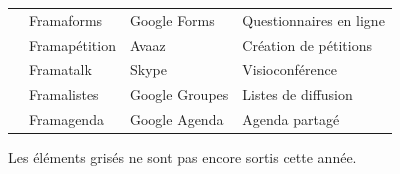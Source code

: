 \documentclass[10pt,a4paper, twoside]{report}
\begin{document}
{\begin{tabular}{|c|l|l|l|}
		\cline{2-4}
		& \cellcolor{lightgray}Framaforms & \cellcolor{lightgray}Google Forms & \cellcolor{lightgray}Questionnaires en ligne \\
		\cline{2-4}
		& \cellcolor{lightgray}Framapétition & \cellcolor{lightgray}Avaaz & \cellcolor{lightgray}Création de pétitions \\
		\cline{2-4}
		& \cellcolor{lightgray}Framatalk & \cellcolor{lightgray}Skype & \cellcolor{lightgray}Visioconférence \\
		\cline{2-4}
		& \cellcolor{lightgray}Framalistes & \cellcolor{lightgray}Google Groupes & \cellcolor{lightgray}Listes de diffusion \\
		\cline{2-4}
		& \cellcolor{lightgray}Framagenda & \cellcolor{lightgray}Google Agenda & \cellcolor{lightgray}Agenda partagé \\
		\hline 
		\end{tabular}}
	
	Les éléments grisés ne sont pas encore sortis cette année.
\end{document}
